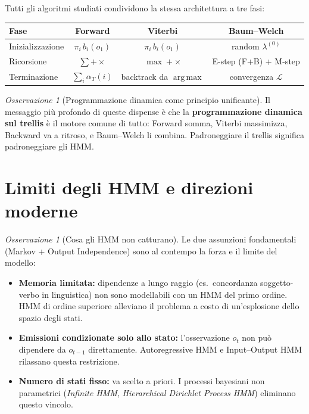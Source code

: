 \documentclass[11pt,a4paper,oneside]{book}
\theoremstyle{plain}
\theoremstyle{definition}
\theoremstyle{remark}
\newtheorem{osservazione}[teorema]{Osservazione}
\newcommand{\hmm}{\lambda}                   %
\newcommand{\Tlen}{T}                        %
\newcommand{\fwd}{\alpha}                    %
\DeclareMathOperator*{\argmax}{arg\,max}
\begin{document}
Tutti gli algoritmi studiati condividono la stessa architettura a
tre fasi:

\begin{center}
\begin{tabular}{lccc}
\toprule
\textbf{Fase} & \textbf{Forward} & \textbf{Viterbi} & \textbf{Baum--Welch}\\
\midrule
Inizializzazione & $\pi_i\,b_i(o_1)$ & $\pi_i\,b_i(o_1)$ & random $\hmm^{(0)}$ \\
Ricorsione & $\sum + \times$ & $\max + \times$ & E-step (F+B) + M-step \\
Terminazione & $\sum_i \fwd_{\Tlen}(i)$ & backtrack da $\argmax$ & convergenza $\mathcal{L}$\\
\bottomrule
\end{tabular}
\end{center}

\begin{osservazione}[Programmazione dinamica come principio unificante]
Il messaggio più profondo di queste dispense è che la
\textbf{programmazione dinamica sul trellis} è il motore comune di
tutto: Forward somma, Viterbi massimizza, Backward va a ritroso, e
Baum--Welch li combina. Padroneggiare il trellis significa padroneggiare
gli HMM.
\end{osservazione}

\section{Limiti degli HMM e direzioni moderne}

\begin{osservazione}[Cosa gli HMM non catturano]
Le due assunzioni fondamentali (Markov + Output Independence) sono
al contempo la forza e il limite del modello:
\begin{itemize}[leftmargin=*]
    \item \textbf{Memoria limitata:} dipendenze a lungo raggio
          (es.\ concordanza soggetto-verbo in linguistica) non sono
          modellabili con un HMM del primo ordine. HMM di ordine
          superiore alleviano il problema a costo di un'esplosione
          dello spazio degli stati.
    \item \textbf{Emissioni condizionate solo allo stato:}
          l'osservazione $o_t$ non può dipendere da $o_{t-1}$
          direttamente. Autoregressive HMM e Input--Output HMM
          rilassano questa restrizione.
    \item \textbf{Numero di stati fisso:} va scelto a priori.
          I processi bayesiani non parametrici (\emph{Infinite HMM},
          \emph{Hierarchical Dirichlet Process HMM}) eliminano questo
          vincolo.
\end{itemize}
\end{osservazione}
\end{document}
